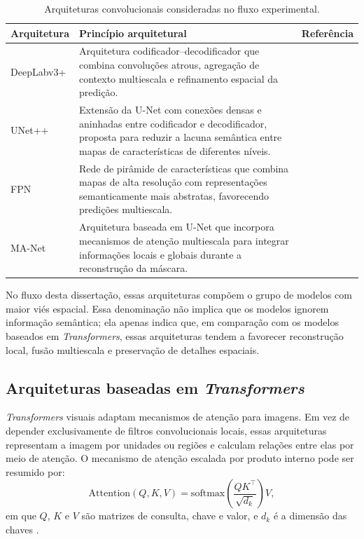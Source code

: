 \begin{table}[!htb]
\centering
\caption{Arquiteturas convolucionais consideradas no fluxo experimental.}
\label{tab:cnn-models}
\begin{tabular}{p{2.8cm}p{8.4cm}p{3.0cm}}
\toprule
Arquitetura & Princípio arquitetural & Referência \\
\midrule
DeepLabv3+ &
Arquitetura codificador--decodificador que combina convoluções atrous,
agregação de contexto multiescala e refinamento espacial da predição. &
\cite{chen2018deeplabv3plus} \\

UNet++ &
Extensão da U-Net com conexões densas e aninhadas entre codificador e
decodificador, proposta para reduzir a lacuna semântica entre mapas de
características de diferentes níveis. &
\cite{zhou2020unetpp} \\

FPN &
Rede de pirâmide de características que combina mapas de alta resolução com
representações semanticamente mais abstratas, favorecendo predições
multiescala. &
\cite{lin2017fpn} \\

MA-Net &
Arquitetura baseada em U-Net que incorpora mecanismos de atenção multiescala
para integrar informações locais e globais durante a reconstrução da máscara. &
\cite{fan2020manet} \\
\bottomrule
\end{tabular}
\end{table}

No fluxo desta dissertação, essas arquiteturas compõem o grupo de modelos com
maior viés espacial. Essa denominação não implica que os modelos ignorem
informação semântica; ela apenas indica que, em comparação com os modelos
baseados em \textit{Transformers}, essas arquiteturas tendem a favorecer
reconstrução local, fusão multiescala e preservação de detalhes espaciais.

\subsection{Arquiteturas baseadas em \textit{Transformers}}
\label{subsec:arquiteturas_transformers}

\textit{Transformers} visuais adaptam mecanismos de atenção para imagens. Em vez
de depender exclusivamente de filtros convolucionais locais, essas arquiteturas
representam a imagem por unidades ou regiões e calculam relações entre elas por
meio de atenção. O mecanismo de atenção escalada por produto interno pode ser
resumido por:
\begin{equation}\label{eq:attention}
    \mathrm{Attention}(Q,K,V)=
    \mathrm{softmax}\left(\frac{QK^\top}{\sqrt{d_k}}\right)V,
\end{equation}
em que $Q$, $K$ e $V$ são matrizes de consulta, chave e valor, e $d_k$ é a
dimensão das chaves \cite{dosovitskiy2021vit}.

